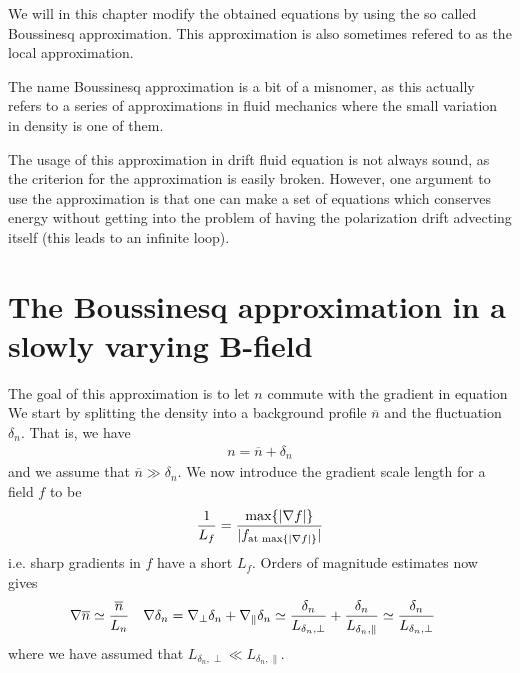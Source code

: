 We will in this chapter modify the obtained equations by using the so called Boussinesq approximation.
This approximation is also sometimes refered to as the local approximation.

The name Boussinesq approximation is a bit of a misnomer, as this actually refers to a series of approximations in fluid mechanics where the small variation in density is one of them.

The usage of this approximation in drift fluid equation is not always sound, as the criterion for the approximation is easily broken.
However, one argument to use the approximation is that one can make a set of equations which conserves energy without getting into the problem of having the polarization drift advecting itself (this leads to an infinite loop).

\section{The Boussinesq approximation in a slowly varying B-field}
\label{sec:boussinesq}
%
The goal of this approximation is to let $n$ commute with the gradient in equation
We start by splitting the density into a background profile $\overline{n}$ and the fluctuation $\delta_n$.
That is, we have
%
\begin{align*}
    n = \overline{n} + \delta_n
\end{align*}
%
%
%
and we assume that $\overline{n} \gg \delta_n$.
We now introduce the gradient scale length for a field $f$ to be
%
\begin{align*}
    \frac{1}{L_f} = \frac{\text{max}\{\left|\nabla f\right|\}}{|f_{\text{at }\text{max}\{\left|\nabla f\right|\}}|}
\end{align*}
%
i.e. sharp gradients in $f$ have a short $L_f$.
Orders of magnitude estimates now gives
%
\begin{align*}
    &\nabla \overline{n} \simeq \frac{\overline{n}}{L_n}&
    &\nabla \delta_n
    =
    \nabla_\perp \delta_n + \nabla_\| \delta_n
    \simeq \frac{\delta_n}{L_{\delta_n, \perp}} + \frac{\delta_n}{L_{\delta_n, \|}}
    \simeq \frac{\delta_n}{L_{\delta_n, \perp}}
    &
\end{align*}
%
where we have assumed that $L_{\delta_n, \perp} \ll L_{\delta_n, \|}$.


